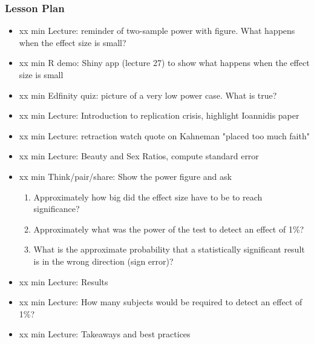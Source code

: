\begin{frame}
    \frametitle{Lesson Plan}
    \begin{itemize}
        \item xx min Lecture: reminder of two-sample power with figure. What happens when the effect size is small?
        \item xx min R demo: Shiny app (lecture 27) to show what happens when the effect size is small
        \item xx min Edfinity quiz: picture of a very low power case. What is true? 
        \item xx min Lecture: Introduction to replication crisis, highlight Ioannidis paper
        \item xx min Lecture: retraction watch quote on Kahneman "placed too much faith"
        \item xx min Lecture: Beauty and Sex Ratios, compute standard error
        \item xx min Think/pair/share: Show the power figure and ask
        \begin{enumerate}
            \item Approximately how big did the effect size have to be to reach significance?
            \item Approximately what was the power of the test to detect an effect of 1\%?
            \item What is the approximate probability that a statistically significant result is in the wrong direction (sign error)?
        \end{enumerate}
        \item xx min Lecture: Results
        \item xx min Lecture: How many subjects would be required to detect an effect of 1\%? 
        \item xx min Lecture: Takeaways and best practices
    \end{itemize}
\end{frame}

